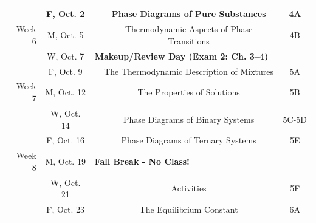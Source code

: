 \documentclass[12pt, letterpaper]{article}
\begin{document}
\begin{tabular}{rcccc}
	       & F, Oct. 2  &                                                                   & Phase Diagrams of Pure Substances          & 4A      \\
	\midrule
	Week 6 & M, Oct. 5  &                                                                   & Thermodynamic Aspects of Phase Transitions & 4B      \\
	       & W, Oct. 7  & \multicolumn{3}{l}{\textbf{Makeup/Review Day (Exam 2: Ch. 3--4)}}                                                        \\
	       & F, Oct. 9  &                                                                   & The Thermodynamic Description of Mixtures  & 5A      \\
	\midrule
	Week 7 & M, Oct. 12 &                                                                   & The Properties of Solutions                & 5B      \\
	       & W, Oct. 14 &                                                                   & Phase Diagrams of Binary Systems           & 5C-5D   \\
	       & F, Oct. 16 &                                                                   & Phase Diagrams of Ternary Systems          & 5E      \\
	\midrule
	Week 8 & M, Oct. 19 & \multicolumn{3}{l}{\textbf{Fall Break - No Class!}}                                                                      \\
	       & W, Oct. 21 &                                                                   & Activities                                 & 5F      \\
	       & F, Oct. 23 &                                                                   & The Equilibrium Constant                   & 6A      \\
\end{tabular}
\end{document}
